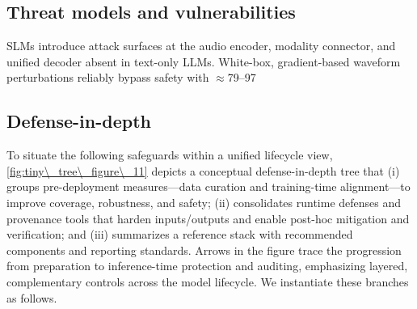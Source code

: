 \documentclass{article}
\begin{document}
\subsection{Threat models and vulnerabilities} \label{subsec:Threat models and vulnerabilities}
SLMs introduce attack surfaces at the audio encoder, modality connector, and unified decoder absent in text-only LLMs. White-box, gradient-based waveform perturbations reliably bypass safety with $\approx$79--97%

\subsection{Defense-in-depth} \label{subsec:Defense-in-depth}
To situate the following safeguards within a unified lifecycle view, \autoref{fig:tiny\_tree\_figure\_11} depicts a conceptual defense-in-depth tree that (i) groups pre-deployment measures---data curation and training-time alignment---to improve coverage, robustness, and safety; (ii) consolidates runtime defenses and provenance tools that harden inputs/outputs and enable post-hoc mitigation and verification; and (iii) summarizes a reference stack with recommended components and reporting standards. Arrows in the figure trace the progression from preparation to inference-time protection and auditing, emphasizing layered, complementary controls across the model lifecycle. We instantiate these branches as follows.
\end{document}
